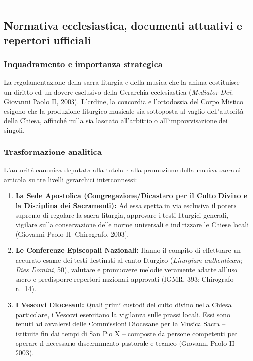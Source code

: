 \documentclass[12pt,a4paper]{article}
\begin{document}
	\begin{center}\rule{0.5\linewidth}{0.5pt}\end{center}
	
	\subsection{Normativa ecclesiastica, documenti attuativi e repertori ufficiali}\label{normativa-ecclesiastica-documenti-attuativi-e-repertori-ufficiali}
	
	\subsubsection{Inquadramento e importanza strategica}\label{inquadramento-e-importanza-strategica-3}
	
	La regolamentazione della sacra liturgia e della musica che la anima costituisce un diritto ed un dovere esclusivo della Gerarchia ecclesiastica (\emph{Mediator Dei}; Giovanni Paolo II, 2003). L'ordine, la concordia e l'ortodossia del Corpo Mistico esigono che la produzione liturgico-musicale sia sottoposta al vaglio dell'autorità della Chiesa, affinché nulla sia lasciato all'arbitrio o all'improvvisazione dei singoli.
	
	\subsubsection{Trasformazione analitica}\label{trasformazione-analitica-3}
	
	L'autorità canonica deputata alla tutela e alla promozione della musica sacra si articola su tre livelli gerarchici interconnessi:
	
	\begin{enumerate}[label=\arabic*.,leftmargin=*]
		\item \textbf{La Sede Apostolica (Congregazione/Dicastero per il Culto Divino e la Disciplina dei Sacramenti):} Ad essa spetta in via esclusiva il potere supremo di regolare la sacra liturgia, approvare i testi liturgici generali, vigilare sulla conservazione delle norme universali e indirizzare le Chiese locali (Giovanni Paolo II, Chirografo, 2003).
		\item \textbf{Le Conferenze Episcopali Nazionali:} Hanno il compito di effettuare un accurato esame dei testi destinati al canto liturgico (\emph{Liturgiam authenticam}; \emph{Dies Domini}, 50), valutare e promuovere melodie veramente adatte all'uso sacro e predisporre repertori nazionali approvati (IGMR, 393; Chirografo n.~14).
		\item \textbf{I Vescovi Diocesani:} Quali primi custodi del culto divino nella Chiesa particolare, i Vescovi esercitano la vigilanza sulle prassi locali. Essi sono tenuti ad avvalersi delle Commissioni Diocesane per la Musica Sacra -- istituite fin dai tempi di San Pio X -- composte da persone competenti per operare il necessario discernimento pastorale e tecnico (Giovanni Paolo II, 2003).
	\end{enumerate}
	
\end{document}
